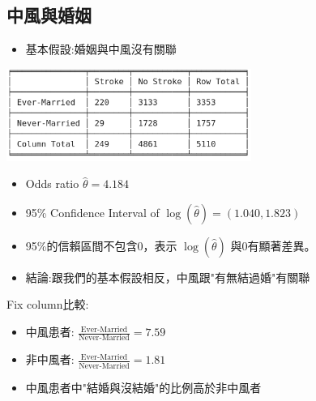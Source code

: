 \subsection{中風與婚姻}
\begin{itemize}
    \item 基本假設:婚姻與中風沒有關聯
\end{itemize}
\begin{center}
    \includegraphics[width=8cm]{./two_by_two_table/evermarry_stroke.png}
\end{center}
\begin{itemize}
    \item Odds ratio $\hat{\theta}=4.184$
    \item 95\% Confidence Interval of $\log{(\hat{\theta})}=(1.040, 1.823)$
    \item 95\%的信賴區間不包含0，表示 $\log{(\hat{\theta})}$ 與0有顯著差異。
    \item 結論:跟我們的基本假設相反，中風跟"有無結過婚"有關聯
\end{itemize}
Fix column比較:
\begin{itemize}
    \item 中風患者: $\frac{\text{Ever-Married}}{\text{Never-Married}}=7.59$
    \item 非中風者: $\frac{\text{Ever-Married}}{\text{Never-Married}}=1.81$
    \item 中風患者中"結婚與沒結婚"的比例高於非中風者
\end{itemize}

